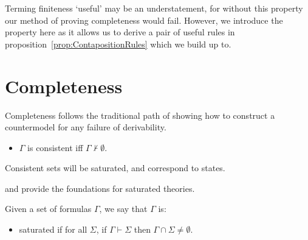 \documentclass[10pt]{article}
\begin{document}
Terming finiteness `useful' may be an understatement, for without this property our method of proving completeness would fail.
However, we introduce the property here as it allows us to derive a pair of useful rules in proposition~\ref{prop:ContapositionRules} which we build up to.


\newpage

\section{Completeness}
\label{sec:completeness-ideas}

Completeness follows the traditional path of showing how to construct a countermodel for any failure of derivability.

\begin{definition}[Consistency]
  \begin{itemize}
  \item \(\Gamma\) is consistent iff \(\Gamma \nvdash \emptyset\).
  \end{itemize}
\end{definition}

Consistent sets will be saturated, and correspond to states.

\textcite{Thomason:1968aa} and \textcite{Aczel:1968aa} provide the foundations for saturated theories.

\begin{definition}[Saturation]
  Given a set of formulas \(\Gamma\), we say that \(\Gamma\) is:
  \begin{itemize}
  \item saturated if for all \(\Sigma\), if \(\Gamma \vdash \Sigma\) then \(\Gamma \cap \Sigma \ne \emptyset\).
  \end{itemize}
\end{definition}
\end{document}
